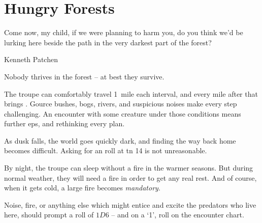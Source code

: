 \chapter{Hungry Forests}
\epigraph{Come now, my child, if we were planning to harm you, do you think we'd be lurking here beside the path in the very darkest part of the forest?}{Kenneth Patchen}

\noindent
Nobody thrives in the forest -- at best they survive.

The troupe can comfortably travel 1~mile each \gls{interval}, and every mile after that brings .%
Gource bushes, bogs, rivers, and suspicious noises make every step challenging.
An encounter with some creature under those conditions means further \glspl{ep}, and rethinking every plan.

As dusk falls, the world goes quickly dark, and finding the way back home becomes difficult.
Asking for an  roll at \gls{tn} 14 is not unreasonable.

By night, the troupe can sleep without a fire in the warmer seasons.
But during normal weather, they will need a fire in order to get any real rest.
And of course, when it gets cold, a large fire becomes \emph{mandatory}.

Noise, fire, or anything else which might entice and excite the predators who live here, should prompt a roll of $1D6$ -- and on a `1', roll on the encounter chart.
